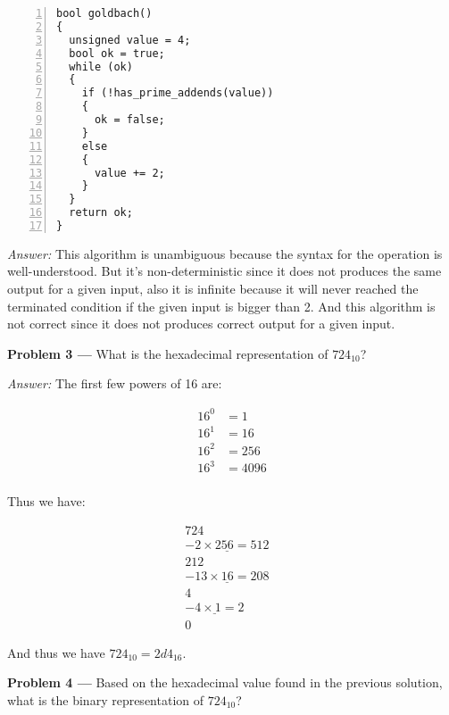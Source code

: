 \documentclass[11pt]{article}
\newcommand{\problem}[1]{\vspace*{2ex}\textbf{Problem #1 ---} }
\newcommand{\answer}{\textit{Answer: }}
\begin{document}
\begin{Verbatim}[numbers=left,xleftmargin=5mm]
bool goldbach()
{
  unsigned value = 4;
  bool ok = true;
  while (ok)
  {
    if (!has_prime_addends(value))
    {
      ok = false;
    }
    else
    {
      value += 2;
    }
  }
  return ok;
}
\end{Verbatim}

\answer This algorithm is unambiguous because the syntax for the operation is well-understood. But it's non-deterministic since it does not produces the same output for a given input, also it is infinite because it will never reached the terminated condition if the given input is bigger than 2. And this algorithm is not correct since it does not produces correct output for a given input.

\problem{3} What is the hexadecimal representation of $724_{10}$?

\answer The first few powers of 16 are:

\begin{align*}
16^0 &= 1\\
16^1 &= 16\\
16^2 &= 256\\
16^3 &= 4096\\
\end{align*}

Thus we have:

\begin{equation*}
\begin{split}
724&\\
\underline{-2 \times 256 = 512}&\\
212&\\
\underline{-13 \times 16 = 208}&\\
4&\\
\underline{-4 \times 1 = 2}&\\
0&
\end{split}
\end{equation*}

And thus we have $724_{10} = 2d4_{16}$.

\problem{4} Based on the hexadecimal value found in the previous
solution, what is the binary representation of $724_{10}$?
\end{document}
